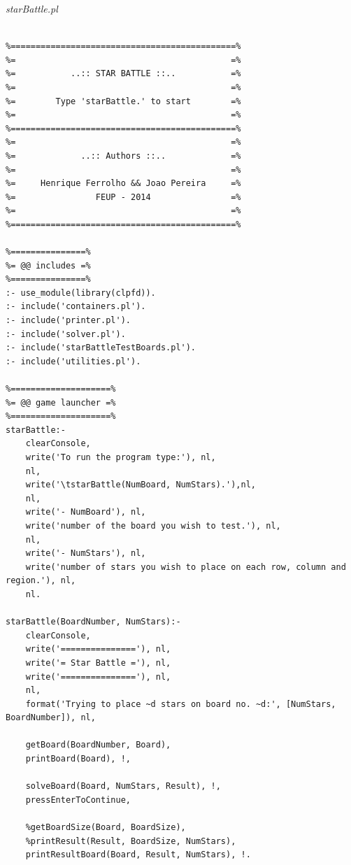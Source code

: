 \documentclass[runningheads,a4paper]{llncs}
\begin{document}
\noindent
{\it starBattle.pl}
\begin{changemargin}{-3cm}{-4cm}
\begin{verbatim}

%=============================================%
%=                                           =%
%=           ..:: STAR BATTLE ::..           =%
%=                                           =%
%=        Type 'starBattle.' to start        =%
%=                                           =%
%=============================================%
%=                                           =%
%=             ..:: Authors ::..             =%
%=                                           =%
%=     Henrique Ferrolho && Joao Pereira     =%
%=                FEUP - 2014                =%
%=                                           =%
%=============================================%

%===============%
%= @@ includes =%
%===============%
:- use_module(library(clpfd)).
:- include('containers.pl').
:- include('printer.pl').
:- include('solver.pl').
:- include('starBattleTestBoards.pl').
:- include('utilities.pl').

%====================%
%= @@ game launcher =%
%====================%
starBattle:-
    clearConsole,
    write('To run the program type:'), nl,
    nl,
    write('\tstarBattle(NumBoard, NumStars).'),nl,
    nl,
    write('- NumBoard'), nl,
    write('number of the board you wish to test.'), nl,
    nl,
    write('- NumStars'), nl,
    write('number of stars you wish to place on each row, column and region.'), nl,
    nl.

starBattle(BoardNumber, NumStars):-
    clearConsole,
    write('==============='), nl,
    write('= Star Battle ='), nl,
    write('==============='), nl,
    nl,
    format('Trying to place ~d stars on board no. ~d:', [NumStars, BoardNumber]), nl,

    getBoard(BoardNumber, Board),
    printBoard(Board), !,

    solveBoard(Board, NumStars, Result), !,
    pressEnterToContinue,

    %getBoardSize(Board, BoardSize),
    %printResult(Result, BoardSize, NumStars),
    printResultBoard(Board, Result, NumStars), !.
    
    
\end{verbatim}
\end{changemargin}
\end{document}
